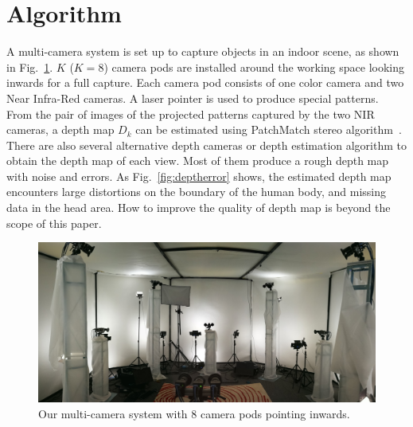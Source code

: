 \section{Algorithm}
\label{sec:overview}



A multi-camera system is set up to capture objects in an indoor scene, as shown in Fig.~\ref{fig:rig}.
%
$K$ ($K=8$) camera pods are installed around the working space looking inwards for a full capture.
Each camera pod consists of one color camera and two Near Infra-Red cameras. A laser pointer is used to produce special patterns. From the pair of images of the projected patterns captured by the two NIR cameras, a depth map $D_k$ can be estimated using PatchMatch stereo algorithm~\cite{Bleyer2011PatchMatch}.
There are also several alternative depth cameras or depth estimation algorithm to obtain the depth map of each view. Most of them produce a rough depth map with noise and errors.
As Fig.~\ref{fig:deptherror} shows, the estimated depth map encounters large distortions on the boundary of the human body, and missing data in the head area.
How to improve the quality of depth map is beyond the scope of this paper.

\begin{figure}
	\centering
	\includegraphics[width=\columnwidth]{image/rig.jpg}
	\caption{Our multi-camera system with 8 camera pods pointing inwards.}
	\label{fig:rig}
\end{figure}



